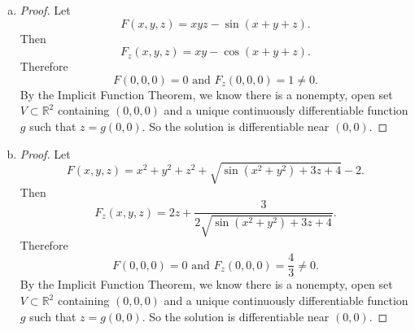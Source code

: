 \begin{Exercise}
\begin{enumerate}[a)]
\item
\begin{proof}
Let
$$
F(x,y,z) = x y z-\sin(x+y+z).
$$
Then
$$
F_z(x,y,z) = x y - \cos(x+y+z).
$$
Therefore
$$
F(0,0,0) = 0\text{ and }F_z(0,0,0) = 1 \neq 0.
$$
By the Implicit Function Theorem, we know there is a nonempty, open set $V\subset\mathbb{R}^2$ containing $(0,0,0)$ and a unique continuously differentiable function
$g$ such that $z = g(0,0)$. So the solution is differentiable near $(0,0)$.
\end{proof}

\item
\begin{proof}
Let
$$
F(x,y,z) = x^2+y^2+z^2+\sqrt{\sin(x^2+y^2)+3z+4}-2.
$$
Then
$$
F_z(x,y,z) = 2z+\frac{3}{2\sqrt{\sin(x^2+y^2)+3z+4}}.
$$
Therefore
$$
F(0,0,0) = 0\text{ and }F_z(0,0,0) = \frac{4}{3} \neq 0.
$$
By the Implicit Function Theorem, we know there is a nonempty, open set $V\subset\mathbb{R}^2$ containing $(0,0,0)$ and a unique continuously differentiable function
$g$ such that $z = g(0,0)$. So the solution is differentiable near $(0,0)$.
\end{proof}
\end{enumerate}
\end{Exercise}